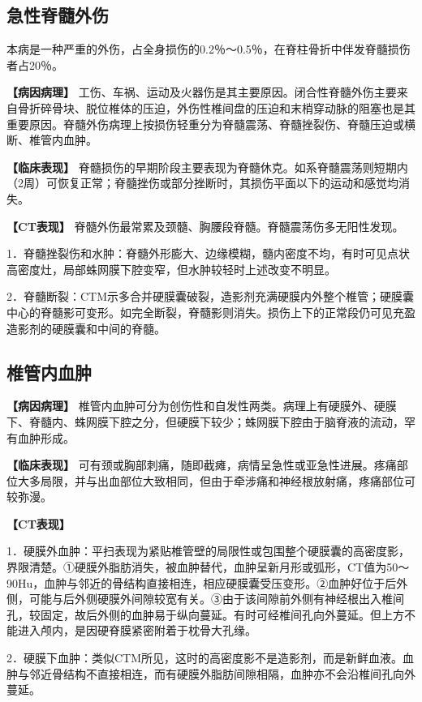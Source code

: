 \subsection{急性脊髓外伤}

本病是一种严重的外伤，占全身损伤的0.2％～0.5％，在脊柱骨折中伴发脊髓损伤者占20％。

\textbf{【病因病理】}
工伤、车祸、运动及火器伤是其主要原因。闭合性脊髓外伤主要来自骨折碎骨块、脱位椎体的压迫，外伤性椎间盘的压迫和末梢穿动脉的阻塞也是其重要原因。脊髓外伤病理上按损伤轻重分为脊髓震荡、脊髓挫裂伤、脊髓压迫或横断、椎管内血肿。

\textbf{【临床表现】}
脊髓损伤的早期阶段主要表现为脊髓休克。如系脊髓震荡则短期内（2周）可恢复正常；脊髓挫伤或部分挫断时，其损伤平面以下的运动和感觉均消失。

\textbf{【CT表现】}
脊髓外伤最常累及颈髓、胸腰段脊髓。脊髓震荡伤多无阳性发现。

1．脊髓挫裂伤和水肿：脊髓外形膨大、边缘模糊，髓内密度不均，有时可见点状高密度灶，局部蛛网膜下腔变窄，但水肿较轻时上述改变不明显。

2．脊髓断裂：CTM示多合并硬膜囊破裂，造影剂充满硬膜内外整个椎管；硬膜囊中心的脊髓影可变形。如完全断裂，脊髓影则消失。损伤上下的正常段仍可见充盈造影剂的硬膜囊和中间的脊髓。

\subsection{椎管内血肿}

\textbf{【病因病理】}
椎管内血肿可分为创伤性和自发性两类。病理上有硬膜外、硬膜下、脊髓内、蛛网膜下腔之分，但硬膜下较少；蛛网膜下腔由于脑脊液的流动，罕有血肿形成。

\textbf{【临床表现】}
可有颈或胸部刺痛，随即截瘫，病情呈急性或亚急性进展。疼痛部位大多局限，并与出血部位大致相同，但由于牵涉痛和神经根放射痛，疼痛部位可较弥漫。

\textbf{【CT表现】}

1．硬膜外血肿：平扫表现为紧贴椎管壁的局限性或包围整个硬膜囊的高密度影，界限清楚。①硬膜外脂肪消失，被血肿替代，血肿呈新月形或弧形，CT值为50～90Hu，血肿与邻近的骨结构直接相连，相应硬膜囊受压变形。②血肿好位于后外侧，可能与后外侧硬膜外间隙较宽有关。③由于该间隙前外侧有神经根出入椎间孔，较固定，故后外侧的血肿易于纵向蔓延。有时可经椎间孔向外蔓延。但上方不能进入颅内，是因硬脊膜紧密附着于枕骨大孔缘。

2．硬膜下血肿：类似CTM所见，这时的高密度影不是造影剂，而是新鲜血液。血肿与邻近骨结构不直接相连，而有硬膜外脂肪间隙相隔，血肿亦不会沿椎间孔向外蔓延。

